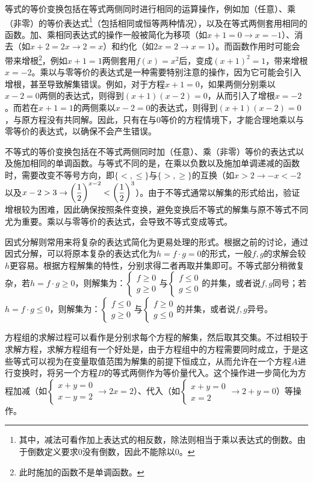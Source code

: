 等式的等价变换包括在等式两侧同时进行相同的运算操作，例如加（任意）、乘（非零）的等价表达式\footnote{其中，减法可看作加上表达式的相反数，除法则相当于乘以表达式的倒数。由于倒数定义要求$0$没有倒数，因此不能除以$0$。}（包括相同或恒等两种情况），以及在等式两侧套用相同的函数。加、乘相同表达式的操作一般被简化为移项（如$x+1=0\to x=-1$）、消去（如$x+2=2x\to 2=x$）和约化（如$2x=2\to x=1$）。而函数作用时可能会带来增根\footnote{此时施加的函数不是单调函数。}，例如$x+1=1$两侧套用$f(x)=x^2$后，变成$(x+1)^2=1$，带来增根$x=-2$。乘以与零等价的表达式是一种需要特别注意的操作，因为它可能会引入增根，甚至导致解集错误。例如，对于方程$x+1=0$，如果两侧分别乘以$x-2=0$两侧的表达式，则得到$(x+1)(x-2)=0$，从而引入了增根$x=-2$。而若在$x+1=1$的两侧乘以$x-2=0$的表达式，则得到$(x+1)(x-2)=0$，与原方程没有共同解。因此，只有在与$0$等价的方程情境下，才能合理地乘以与零等价的表达式，以确保不会产生错误。

不等式的等价变换包括在不等式两侧同时加（任意）、乘（非零）等价的表达式以及施加相同的单调函数。与等式不同的是，在乘以负数以及施加单调递减的函数时，需要改变不等号方向，即$\{<,\leq\}$与$\{>,\geq\}$的互换（如$x>2\to-x<-2$以及$\displaystyle x-2>3\to\left({1\over2}\right)^{x-2}<\left({1\over2}\right)^3$）。由于不等式通常以解集的形式给出，验证增根较为困难，因此确保按照条件变换，避免变换后不等式的解集与原不等式不同尤为重要。乘以与零等价的表达式，会导致不等式变成等式。

因式分解则常用来将复杂的表达式简化为更易处理的形式。根据之前的讨论，通过因式分解，可以将原本复杂的表达式化为$h=f\cdot g=0$的形式，一般$f,g$的求解会较$h$更容易。根据方程解集的特性，分别求得二者再取并集即可。不等式部分稍微复杂，若$h=f\cdot g\geq0$，则解集为：$\begin{cases}f \geq 0 \\ g \geq 0\end{cases}$与$\begin{cases}f \leq 0 \\ g \leq 0\end{cases}$的并集，或者说$f,g$同号；若$h=f\cdot g\leq0$，则解集为：$\begin{cases}f \leq 0 \\ g \geq 0\end{cases}$与$\begin{cases}f \geq 0 \\ g \leq 0\end{cases}$的并集，或者说$f,g$异号。

方程组的求解过程可以看作是分别求每个方程的解集，然后取其交集。不过相较于求解方程，求解方程组有一个好处是，由于方程组中的方程需要同时成立，于是这些等式可以视为在变量取值范围为解集的前提下恒成立，从而允许在一个方程$A$进行变换时，将另一个方程$B$的等式两侧作为等价量代入。这个操作进一步简化为方程加减（如$\begin{cases}x+y= 0 \\ x-y =2\end{cases}\to 2x=2$）、代入（如$\begin{cases}x+y= 0 \\ x=2\end{cases}\to 2+y=0$）等操作。
